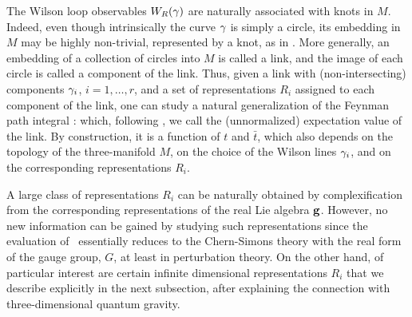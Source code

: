 The Wilson loop observables $W_{R} (\gamma)$ are naturally associated
with knots in $M$. Indeed, even though intrinsically the curve $\gamma$
is simply a circle, its embedding in $M$ may be highly non-trivial,
represented by a knot, as in \aknot.
More generally, an embedding of a collection of circles
into $M$ is called a link,
and the image of each circle is called a component of the link.
Thus, given a link with (non-intersecting)
components $\gamma_i$, $i=1, \ldots, r$,
and a set of representations $R_i$ assigned to each component
of the link, one can study a natural generalization of
the Feynman path integral \zpathint:
%
\eqn{}
%
which, following \WittenJones, we call the (unnormalized) expectation
value of the link.
By construction, it is a function of $t$ and $\bar t$,
which also depends on the topology of the three-manifold $M$,
on the choice of the Wilson lines $\gamma_i$,
and on the corresponding representations $R_i$.

A large class of representations $R_i$ can be naturally
obtained by complexification from the corresponding
representations of the real Lie algebra ${\bf g}$.
However, no new information can be gained by studying such
representations since the evaluation of \zwpathint\
essentially reduces to the Chern-Simons theory with
the real form of the gauge group, $G$, at least in perturbation
theory.
On the other hand, of particular interest are certain infinite
dimensional representations $R_i$ that we describe explicitly
in the next subsection, after explaining the connection with
three-dimensional quantum gravity.


